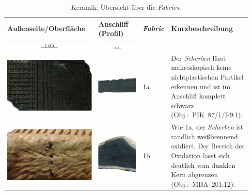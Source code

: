 \begin{footnotesize}
{\sffamily
\begin{longtable}{@{}m{}m{}m{}m{}@{}}
\toprule
\textbf{Außenseite/Oberfläche} & \textbf{Anschliff (Profil)} & \textbf{\textit{Fabric}} & \textbf{Kurzbeschreibung} \\
\midrule
\endhead
\includegraphics[width=.3\textwidth, page = 1]{tbl/Tab_Fabrics/x_fabrics_scales.pdf} & \includegraphics[width=.3\textwidth, page = 2]{tbl/Tab_Fabrics/x_fabrics_scales.pdf} &  &  \\
\bottomrule
\caption{Keramik: Übersicht über die \textit{Fabrics}.}
\label{tab:Fabrics_Bilder}
\endfoot
\includegraphics[width=.3\textwidth]{tbl/Tab_Fabrics/PIK87-1-8-6_aussen_5cm.jpg} & \includegraphics[width=.3\textwidth]{tbl/Tab_Fabrics/PIK87-1I9-1_2cm.jpg} & 1a & Der \textit{Scherben} lässt makroskopisch keine nichtplastischen Partikel erkennen und ist im Anschliff komplett schwarz (Obj.:~PIK~87/1/I-9:1). \\
\includegraphics[width=.3\textwidth]{tbl/Tab_Fabrics/MBA_201-12_5cm.jpg} & \includegraphics[width=.3\textwidth]{tbl/Tab_Fabrics/MBA_201-12_2cm.jpg} & 1b & Wie 1a, der \textit{Scherben} ist randlich weißbrennend oxidiert. Der Bereich der Oxidation lässt sich deutlich vom dunklen Kern abgrenzen (Obj.:~MBA~201:12). \\

\end{longtable}}
\end{footnotesize}
